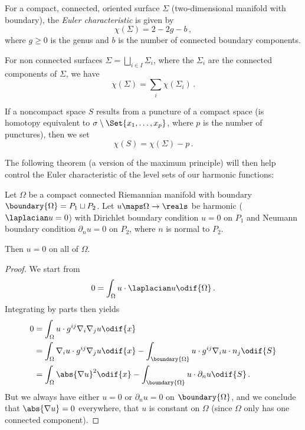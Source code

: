 \documentclass[titlepage,numbers=noenddot,oneside,%
cleardoublepage=empty,paper=a4,fontsize=11pt,%
english,%
]{scrartcl}
\newcommand*{\mathcomma}{\,,}
\newcommand*{\mathfullstop}{\,.}
\begin{document}
\begin{definition}
    For a compact, connected, oriented surface \( \Sigma \) (two-dimensional manifold with boundary), the \emph{Euler characteristic} is given by
    \begin{equation}
        \chi(\Sigma)=2-2g-b\mathcomma\label{eq:def_euler_characteristic}
    \end{equation}
    where \( g\geq 0 \) is the genus and \( b \) is the number of connected boundary components.

    For non connected surfaces \( \Sigma=\bigsqcup_{i\in I} \Sigma_i \), where the \( \Sigma_i \) are the connected components of \( \Sigma \), we have
    \begin{equation*}
        \chi(\Sigma)=\sum_{i}\chi(\Sigma_i)\mathfullstop
    \end{equation*}

    If a noncompact space \( S \) results from a puncture of a compact space (is homotopy equivalent to \( \sigma\setminus \Set{x_1,\dotsc,x_p} \), where \( p \) is the number of punctures), then we set
    \begin{equation}
        \chi(S)=\chi(\Sigma)-p\mathfullstop\label{eq:def_euler_characteristic_noncompact}
    \end{equation}
\end{definition}
The following theorem (a version of the maximum principle) will then help control the Euler characteristic of the level sets of our harmonic functions:
\begin{theorem}\label{thm:maximum_principle}
 Let \( \Omega \) be a compact connected Riemannian manifold with boundary \( \boundary{\Omega}=P_1\sqcup P_2 \). Let \( u\maps \Omega\to \reals \) be harmonic (\ie \( \laplacian u=0 \)) with Dirichlet boundary condition \( u= 0 \) on \( P_1 \) and Neumann boundary condition \( \partial_n u=0 \) on \( P_2 \), where \( n \) is normal to \( P_2 \).

 Then \( u=0 \) on all of \( \Omega \).
\end{theorem}
\begin{proof}
    We start from
    \begin{equation*}
        0=\int_\Omega u\cdot \laplacian u\odif{\Omega}\mathfullstop
    \end{equation*}
    Integrating by parts then yields
    \begin{align*}
        0&=\int_\Omega u\cdot g^{ij}\nabla_i \nabla_j u\odif{x}\\
        &=\int_\Omega \nabla_i u\cdot g^{ij} \nabla_j u\odif{x}-\int_{\boundary{\Omega}}u\cdot g^{ij}\nabla_i u \cdot n_j \odif{S}\\
        &=\int_\Omega \abs{\nabla u}^2\odif{x}-\int_{\boundary{\Omega}}u\cdot \partial_n u\odif{S}\mathfullstop
    \end{align*}
    But we always have either \( u=0 \) or \( \partial_n u=0 \) on \( \boundary{\Omega} \), and we conclude that \( \abs{\nabla u}=0 \) everywhere, \ie that \( u \) is constant on \( \Omega \) (since \( \Omega \) only has one connected component).
\end{proof}
\end{document}
